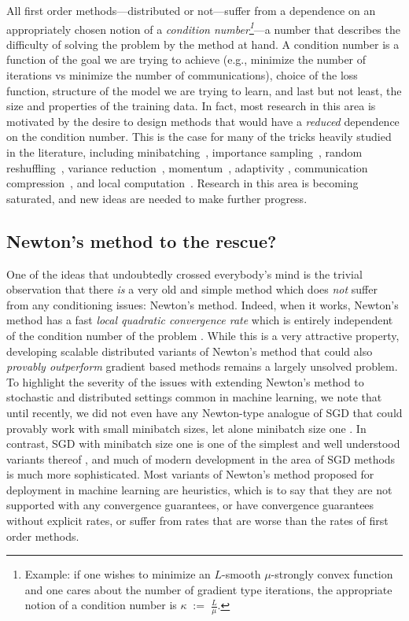 \documentclass[12pt]{article}
\newcommand{\eqdef}{\; { := }\;}
\begin{document}
All first order methods---distributed or not---suffer from a dependence on an appropriately chosen notion of a {\em condition number\footnote{Example: if one wishes to minimize an $L$-smooth $\mu$-strongly convex function  and one cares about the number of gradient type iterations, the appropriate notion of a condition number is $\kappa \eqdef \frac{L}{\mu}$.}}---a number that describes the difficulty of solving the problem by the method at hand. A condition number is a function of the goal we are trying to achieve (e.g., minimize the number of iterations vs minimize the  number of communications), choice of the loss function, structure of the model we are trying to learn, and last but not least, the size and properties of the training data. In fact, most research in this area is motivated by the desire to design methods that would have a {\em reduced} dependence on the condition number. This is the case for many of the tricks heavily studied in the literature, including minibatching~\citep{pegasos2}, importance sampling~\citep{NeedellWard2015, IProx-SDCA}, random reshuffling~\citep{RR}, variance reduction~\citep{schmidt2017minimizing, johnson2013accelerating, proxSVRG, SAGA}, momentum~\citep{SHB-NIPS, SMOMENTUM}, adaptivity \citep{MM2019}, communication compression~\citep{Alistarh17, Bernstein18, DIANA}, and local computation~\citep{COCOA+journal, localSGD-Stich,localSGD-AISTATS2020}.  Research in this area is becoming saturated, and new ideas are needed to make further progress.

\subsection{Newton's method to the rescue?} One of the ideas that undoubtedly crossed everybody's mind is the trivial observation that there {\em is} a very old and simple method which does {\em not} suffer from any conditioning issues: Newton's method. Indeed, when it works, Newton's method has a fast {\em local quadratic convergence rate} which is entirely independent of the condition number of the problem \citep{Beck-book-nonlinear}. While this is a very attractive property, developing  scalable distributed variants of Newton's method that could also {\em provably outperform} gradient based methods remains a largely unsolved problem. To highlight the severity of the issues with extending Newton's method to stochastic and distributed settings common in machine learning, we note that until recently, we did not even have any Newton-type analogue of SGD that could provably work with small minibatch sizes, let alone minibatch size one \citep{SN2019}. In contrast, SGD with minibatch size one is one of the simplest and well understood variants thereof \citep{NeedellWard2015}, and much of modern development in the area of SGD methods is much more sophisticated.  Most variants of Newton's method proposed for deployment in machine learning are heuristics, which is to say that they are not supported with any convergence guarantees, or have convergence guarantees without explicit rates, or suffer from rates that are worse than the rates of first order methods.  
\end{document}
